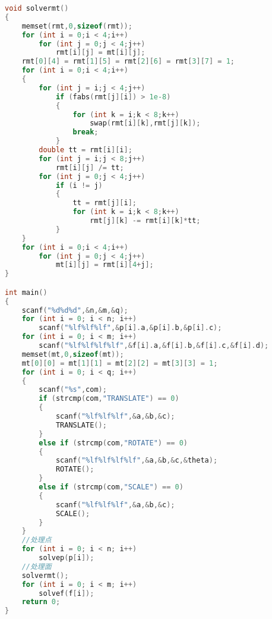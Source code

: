 \begin{lstlisting}[language=c++]
void solvermt()
{
	memset(rmt,0,sizeof(rmt));
	for (int i = 0;i < 4;i++)
		for (int j = 0;j < 4;j++)
			rmt[i][j] = mt[i][j];
	rmt[0][4] = rmt[1][5] = rmt[2][6] = rmt[3][7] = 1;
	for (int i = 0;i < 4;i++)
	{
		for (int j = i;j < 4;j++)
			if (fabs(rmt[j][i]) > 1e-8)
			{
				for (int k = i;k < 8;k++)
					swap(rmt[i][k],rmt[j][k]);
				break;
			}
		double tt = rmt[i][i];
		for (int j = i;j < 8;j++)
			rmt[i][j] /= tt;
		for (int j = 0;j < 4;j++)
			if (i != j)
			{
				tt = rmt[j][i];
				for (int k = i;k < 8;k++)
					rmt[j][k] -= rmt[i][k]*tt;
			}
	}
	for (int i = 0;i < 4;i++)
		for (int j = 0;j < 4;j++)
			mt[i][j] = rmt[i][4+j];
}

int main()
{
	scanf("%d%d%d",&n,&m,&q);
	for (int i = 0; i < n; i++)
		scanf("%lf%lf%lf",&p[i].a,&p[i].b,&p[i].c);
	for (int i = 0; i < m; i++)
		scanf("%lf%lf%lf%lf",&f[i].a,&f[i].b,&f[i].c,&f[i].d);
	memset(mt,0,sizeof(mt));
	mt[0][0] = mt[1][1] = mt[2][2] = mt[3][3] = 1;
	for (int i = 0; i < q; i++)
	{
		scanf("%s",com);
		if (strcmp(com,"TRANSLATE") == 0)
		{
			scanf("%lf%lf%lf",&a,&b,&c);
			TRANSLATE();
		}
		else if (strcmp(com,"ROTATE") == 0)
		{
			scanf("%lf%lf%lf%lf",&a,&b,&c,&theta);
			ROTATE();
		}
		else if (strcmp(com,"SCALE") == 0)
		{
			scanf("%lf%lf%lf",&a,&b,&c);
			SCALE();
		}
	}
	//处理点
	for (int i = 0; i < n; i++)
		solvep(p[i]);
	//处理面
	solvermt();
	for (int i = 0; i < m; i++)
		solvef(f[i]);
	return 0;
}
	\end{lstlisting}
